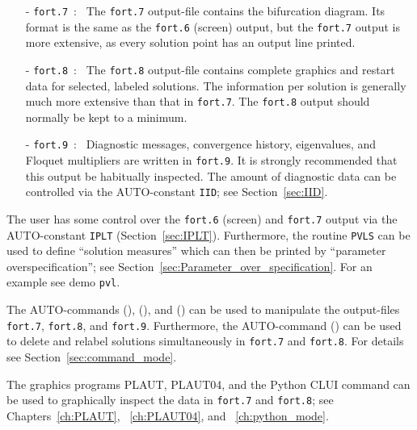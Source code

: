 \documentclass[12pt]{report}
\begin{document}
\begin{itemize}
\item[-] {\tt fort.7}~:~ 
  The {\tt fort.7} output-file contains the bifurcation diagram.
  Its format is the same as the {\tt fort.6} (screen) output, 
  but the {\tt fort.7} output is more extensive, as every solution point has 
  an output line printed.
\item[-] {\tt fort.8}~:~ 
  The {\tt fort.8} output-file contains complete graphics and restart data
  for selected, labeled solutions. 
  The information per solution is generally much more extensive than
  that in {\tt fort.7}. 
  The {\tt fort.8} output should normally be kept to a minimum.
\item[-] {\tt fort.9}~:~
  Diagnostic messages, convergence history, eigenvalues, and 
  Floquet multipliers are written in {\tt fort.9}.
  It is strongly recommended that this output be habitually inspected.
  The amount of diagnostic data can be controlled via the {\cal AUTO}-constant {\tt IID};
  see Section~\ref{sec:IID}.
\end{itemize}

The user has some control over the {\tt fort.6} (screen) and {\tt fort.7} output 
via the {\cal AUTO}-constant {\tt IPLT} (Section~\ref{sec:IPLT}).
Furthermore, the routine {\tt PVLS} can be used to define ``solution measures''
which can then be printed by ``parameter overspecification'';
see Section~\ref{sec:Parameter_over_specification}.
For an example see demo {\tt pvl}.

The {\cal AUTO}-commands (), (),
 and () can be used 
to manipulate  the output-files {\tt fort.7}, {\tt fort.8},
and {\tt fort.9}.
Furthermore, the {\cal AUTO}-command () can be
used to delete and
relabel solutions simultaneously in {\tt fort.7} and {\tt fort.8}.
For details see Section~\ref{sec:command_mode}.

The graphics programs {\cal PLAUT}, {\cal PLAUT04}, and the Python
CLUI command  can be used to graphically inspect 
the data in {\tt fort.7} and {\tt fort.8}; see Chapters~\ref{ch:PLAUT},
~\ref{ch:PLAUT04}, and ~\ref{ch:python_mode}.
 
\end{document}
